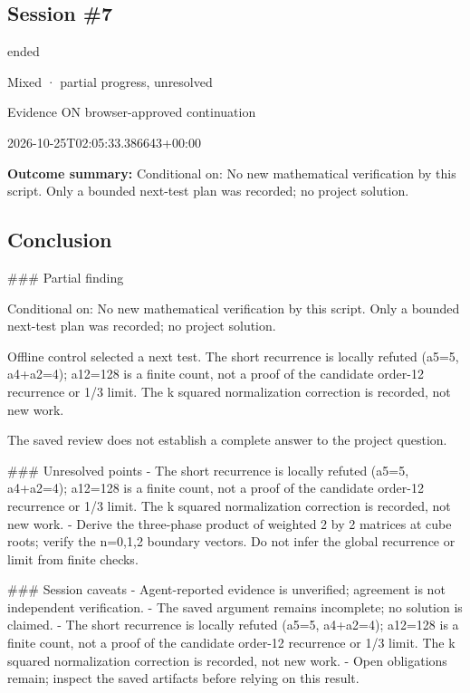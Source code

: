 \documentclass[11pt]{article}
\begin{document}
\subsection{Session \#7}
\begin{description}[style=nextline,font=\normalfont\bfseries,leftmargin=0pt,labelsep=0pt]
\item[Execution status] ended
\item[Outcome] Mixed · partial progress, unresolved
\item[Strategy] Evidence ON browser-approved continuation
\item[Started] 2026-10-25T02:05:33.386643+00:00
\end{description}
\textbf{Outcome summary:} Conditional on: No new mathematical verification by this script. Only a bounded next-test plan was recorded; no project solution.\par
\subsection{Conclusion}
\#\#\# Partial finding

Conditional on: No new mathematical verification by this script. Only a bounded next-test plan was recorded; no project solution.

Offline control selected a next test. The short recurrence is locally refuted (a5=5, a4+a2=4); a12=128 is a finite count, not a proof of the candidate order-12 recurrence or 1/3 limit. The k squared normalization correction is recorded, not new work.

The saved review does not establish a complete answer to the project question.

\#\#\# Unresolved points
- The short recurrence is locally refuted (a5=5, a4+a2=4); a12=128 is a finite count, not a proof of the candidate order-12 recurrence or 1/3 limit. The k squared normalization correction is recorded, not new work.
- Derive the three-phase product of weighted 2 by 2 matrices at cube roots; verify the n=0,1,2 boundary vectors. Do not infer the global recurrence or limit from finite checks.

\#\#\# Session caveats
- Agent-reported evidence is unverified; agreement is not independent verification.
- The saved argument remains incomplete; no solution is claimed.
- The short recurrence is locally refuted (a5=5, a4+a2=4); a12=128 is a finite count, not a proof of the candidate order-12 recurrence or 1/3 limit. The k squared normalization correction is recorded, not new work.
- Open obligations remain; inspect the saved artifacts before relying on this result.
\end{document}
